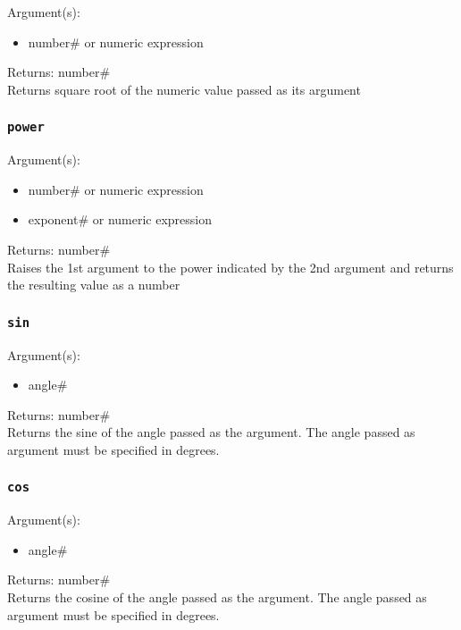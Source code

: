 \documentclass[a4paper]{article}
\begin{document}
Argument(s):
\begin{itemize}
	\item number\# or numeric expression
\end{itemize}

\noindent Returns: number\#\\

Returns square root of the numeric value passed as its argument

\subsubsection{\texttt{power}}

Argument(s):
\begin{itemize}
	\item number\# or numeric expression
	\item exponent\# or numeric expression
\end{itemize}

\noindent Returns: number\#\\

Raises the 1st argument to the power indicated by the 2nd argument and returns the resulting value as a number

\subsubsection{\texttt{sin}}

Argument(s):
\begin{itemize}
	\item angle\#
\end{itemize}

\noindent Returns: number\#\\

Returns the sine of the angle passed as the argument.  The angle passed as argument must be specified in degrees.

\subsubsection{\texttt{cos}}

Argument(s):
\begin{itemize}
	\item angle\#
\end{itemize}

\noindent Returns: number\#\\

Returns the cosine of the angle passed as the argument.  The angle passed as argument must be specified in degrees.
\end{document}
